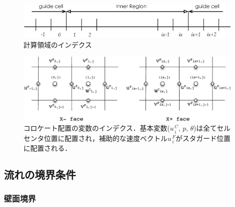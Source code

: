 \begin{figure}[htdp]
  \begin{center}
  \includegraphics[width=12cm,clip]{index_domain.eps}
  \end{center}
  \caption{計算領域のインデクス}
  \label{fig:index_domain}
\end{figure}

\begin{figure}[htdp]
  \begin{center}
  \includegraphics[width=14cm,clip]{index_cc.eps}
  \end{center}
  \caption{コロケート配置の変数のインデクス．基本変数($u_{\,i}^{\,C},\, p,\,\theta$)は全てセルセンタ位置に配置され，補助的な速度ベクトル$u_{\,i}^{\,F}$がスタガード位置に配置される．}
  \label{fig:index_cc}
\end{figure}


%
\subsection{流れの境界条件}
\label{sec:Boundary Conditions}

%
\subsubsection{壁面境界}
\label{sec:BC wall}

